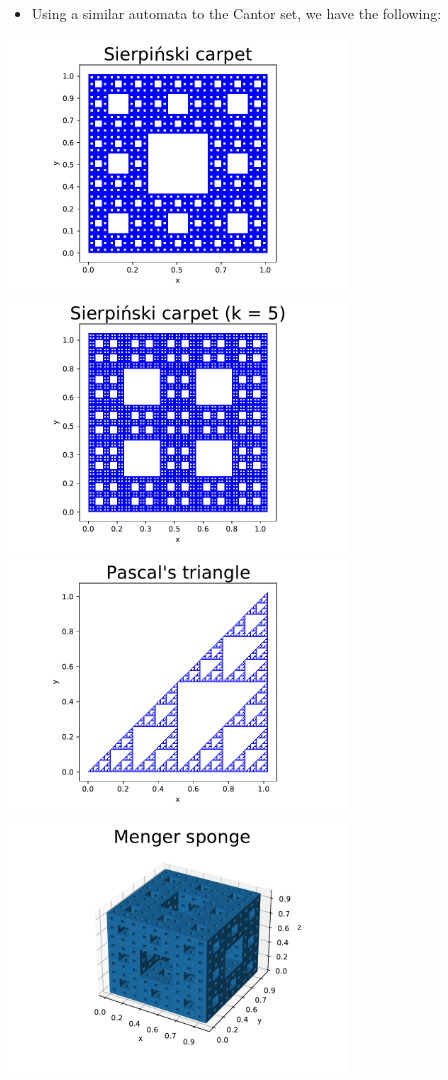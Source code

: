 \documentclass[landscape,usenames,dvipsnames, 25pt]{sciposter}
\begin{document}
\begin{multicols}{3}
\begin{itemize}
    \item Using a similar automata to the Cantor set, we have the following:
\end{itemize}
    
\begin{center}
    \includegraphics[width=9cm]{FA20/images/fractals/sierpinski-3-l4.pdf}
    \includegraphics[width=9cm]{FA20/images/fractals/sierpinski-5-l3.pdf}
    \includegraphics[width=9cm]{FA20/images/fractals/pascal2-l8.pdf} \\
    \includegraphics[width=9cm]{FA20/images/fractals/menger-3-l3.pdf}

\end{center}
\end{multicols}
\end{document}
